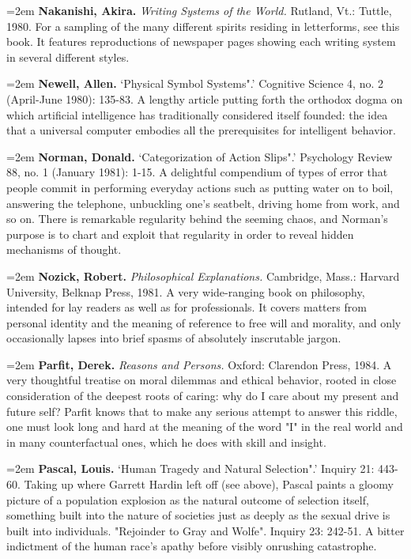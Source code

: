 \par\noindent\hangindent=2em {\bf Nakanishi, Akira.} {\it Writing Systems of the World.} Rutland, Vt.: Tuttle, 1980. For a sampling of the many different spirits residing in letterforms, see this book. It features reproductions of newspaper pages showing each writing system in several different styles.

\par\noindent\hangindent=2em {\bf Newell, Allen.} `Physical Symbol Systems".' Cognitive Science 4, no. 2 (April-June 1980): 135-83. A lengthy article putting forth the orthodox dogma on which artificial intelligence has traditionally considered itself founded: the idea that a universal computer embodies all the prerequisites for intelligent behavior.

\par\noindent\hangindent=2em {\bf Norman, Donald.} `Categorization of Action Slips".' Psychology Review 88, no. 1 (January 1981): 1-15. A delightful compendium of types of error that people commit in performing everyday actions such as putting water on to boil, answering the telephone, unbuckling one's seatbelt, driving home from work, and so on. There is remarkable regularity behind the seeming chaos, and Norman's purpose is to chart and exploit that regularity in order to reveal hidden mechanisms of thought.

\par\noindent\hangindent=2em {\bf Nozick, Robert.} {\it Philosophical Explanations.} Cambridge, Mass.: Harvard University, Belknap Press, 1981. A very wide-ranging book on philosophy, intended for lay readers as well as for professionals. It covers matters from personal identity and the meaning of reference to free will and morality, and only occasionally lapses into brief spasms of absolutely inscrutable jargon.

\par\noindent\hangindent=2em {\bf Parfit, Derek.} {\it Reasons and Persons.} Oxford: Clarendon Press, 1984. A very thoughtful treatise on moral dilemmas and ethical behavior, rooted in close consideration of the deepest roots of caring: why do I care about my present and future self? Parfit knows that to make any serious attempt to answer this riddle, one must look long and hard at the meaning of the word "I" in the real world and in many counterfactual ones, which he does with skill and insight.

\par\noindent\hangindent=2em {\bf Pascal, Louis.} `Human Tragedy and Natural Selection".' Inquiry 21: 443-60. Taking up where Garrett Hardin left off (see above), Pascal paints a gloomy picture of a population explosion as the natural outcome of selection itself, something built into the nature of societies just as deeply as the sexual drive is built into individuals. "Rejoinder to Gray and Wolfe". Inquiry 23: 242-51. A bitter indictment of the human race's apathy before visibly onrushing catastrophe.

